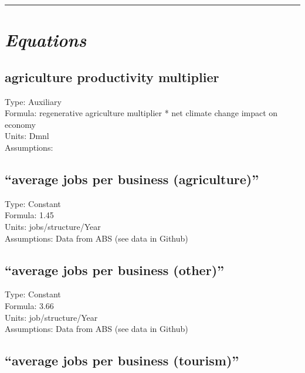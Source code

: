 \documentclass[
  11pt,
]{book}
\begin{document}
\begin{center}\rule{0.5\linewidth}{0.5pt}\end{center}

\hypertarget{equations-3}{%
\section{\texorpdfstring{\emph{Equations}}{Equations}}\label{equations-3}}

\hypertarget{agriculture-productivity-multiplier}{%
\subsection{agriculture productivity multiplier}\label{agriculture-productivity-multiplier}}

Type: Auxiliary\\
Formula: regenerative agriculture multiplier * net climate change impact on economy\\
Units: Dmnl\\
Assumptions:

\hypertarget{average-jobs-per-business-agriculture}{%
\subsection{``average jobs per business (agriculture)''}\label{average-jobs-per-business-agriculture}}

Type: Constant\\
Formula: 1.45\\
Units: jobs/structure/Year\\
Assumptions: Data from ABS (see data in Github)

\hypertarget{average-jobs-per-business-other}{%
\subsection{``average jobs per business (other)''}\label{average-jobs-per-business-other}}

Type: Constant\\
Formula: 3.66\\
Units: job/structure/Year\\
Assumptions: Data from ABS (see data in Github)

\hypertarget{average-jobs-per-business-tourism}{%
\subsection{``average jobs per business (tourism)''}\label{average-jobs-per-business-tourism}}
\end{document}
